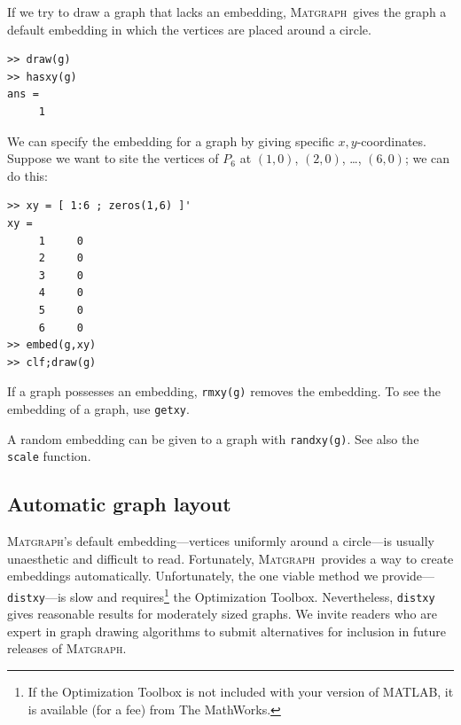 \documentclass[12pt]{amsart}
\newcommand\matlab{MATLAB}
\newcommand\matgraph{\textsc{Matgraph}}
\begin{document}
If we try to draw a graph that lacks an embedding, \matgraph\ gives
the graph a default embedding in which the vertices are placed around
a circle. 
\begin{verbatim}
>> draw(g)
>> hasxy(g)
ans =
     1
\end{verbatim}
We can specify the embedding for a graph by giving specific
$x,y$-coordinates. Suppose we want to site the vertices of $P_6$ at
$(1,0)$, $(2,0)$, \ldots, $(6,0)$; we can do this:
\begin{verbatim}
>> xy = [ 1:6 ; zeros(1,6) ]'
xy =
     1     0
     2     0
     3     0
     4     0
     5     0
     6     0
>> embed(g,xy)
>> clf;draw(g)
\end{verbatim}

If a graph possesses an embedding, \verb|rmxy(g)| removes the
embedding. To see the embedding of a graph, use \verb|getxy|.

A random embedding can be given to a graph with \verb|randxy(g)|. See
also the \verb|scale| function.


\subsection{Automatic graph layout}

\matgraph's default embedding---vertices uniformly around a
circle---is usually unaesthetic and difficult to read. Fortunately,
\matgraph\ provides a way to create embeddings automatically.
Unfortunately, the one viable method we provide---\verb|distxy|---is
slow and requires\footnote{If the Optimization Toolbox is not included
  with your version of \matlab, it is available (for a fee) from The
  MathWorks.}  the Optimization Toolbox. Nevertheless, \verb|distxy|
gives reasonable results for moderately sized graphs. We invite
readers who are expert in graph drawing algorithms to submit
alternatives for inclusion in future releases of \matgraph.
\end{document}
